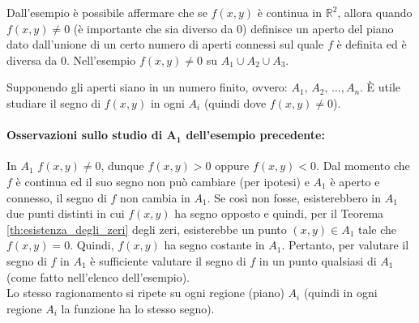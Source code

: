 Dall'esempio è possibile affermare che se $f(x,y)$ è continua in $\mathbb R^2$, allora quando $f(x,y)\neq 0$ (è importante che sia diverso da 0) definisce un aperto del piano dato dall'unione di un certo numero di aperti connessi sul quale $f$ è definita ed è diversa da 0. Nell'esempio $f(x,y)\neq 0$ su $A_1\cup A_2\cup A_3$.

Supponendo gli aperti siano in un numero finito, ovvero: $A_1,\, A_2,\, \hdots, A_n$. È utile studiare il segno di $f(x,y)$ in ogni $A_i$ (quindi dove $f(x,y)\neq 0$).

\paragraph{Osservazioni sullo studio di $\boldsymbol{A_1}$ dell'esempio precedente:} In $A_1$ $f(x,y)\neq 0$, dunque $f(x,y)>0$ oppure $f(x,y)<0$. Dal momento che $f$ è continua ed il suo segno non può cambiare (per ipotesi) e $A_1$ è aperto e connesso, il segno di $f$ non cambia in $A_1$. Se così non fosse, esisterebbero in $A_1$ due punti distinti in cui $f(x,y)$ ha segno opposto e quindi, per il Teorema \ref{th:esistenza_degli_zeri} degli zeri, esisterebbe un punto $(x,y)\in A_1$ tale che $f(x,y)=0$. Quindi, $f(x,y)$ ha segno costante in $A_1$. Pertanto, per valutare il segno di $f$ in $A_1$ è sufficiente valutare il segno di $f$ in un punto qualsiasi di $A_1$ (come fatto nell'elenco dell'esempio).\\
Lo stesso ragionamento si ripete su ogni regione (piano) $A_i$ (quindi in ogni regione $A_i$ la funzione ha lo stesso segno).

